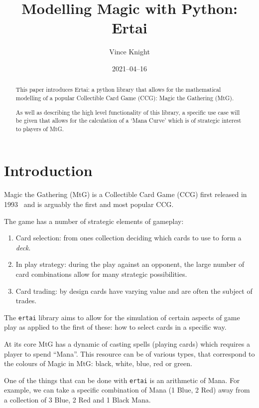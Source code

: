 \documentclass{article}
\title{Modelling Magic with Python: Ertai}
\author{Vince Knight}
\date{2021--04--16}
\begin{document}
\maketitle

\begin{abstract}
This paper introduces Ertai: a python library that allows for the mathematical
modelling of a popular Collectible Card Game (CCG): Magic the Gathering (MtG).

As well as describing the high level functionality of this library, a specific
use case will be given that allows for the calculation of a `Mana Curve' which
is of strategic interest to players of MtG.
\end{abstract}

\section{Introduction}

Magic the Gathering (MtG) is a Collectible Card Game (CCG) first released in
1993~\cite{mtg-wikipedia} and is arguably the first and most popular CCG\@.

The game has a number of strategic elements of gameplay:

\begin{enumerate}
    \item Card selection: from ones collection deciding which cards to use to
        form a \textit{deck}.
    \item In play strategy: during the play against an opponent, the large
        number of card combinations allow for many strategic possibilities.
    \item Card trading: by design cards have varying value and are often the
        subject of trades.
\end{enumerate}

The \texttt{ertai} library aims to allow for the simulation of
certain aspects of game play as applied to the first of these: how to select
cards in a specific way.

At its core MtG has a dynamic of casting spells (playing cards) which requires a
player to spend ``Mana''. This resource can be of various types, that correspond
to the colours of Magic in MtG: black, white, blue, red or green.

One of the things that can be done with \texttt{ertai} is an
arithmetic of Mana. For example, we can take a specific combination of Mana (1
Blue, 2 Red) away from a collection of 3 Blue, 2 Red and 1 Black Mana.
\end{document}
